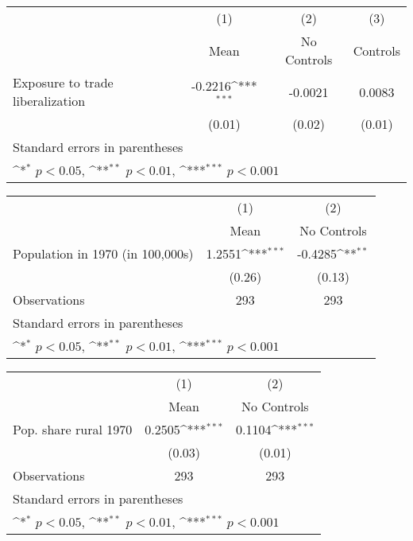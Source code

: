 {
\def\sym#1{\ifmmode^{#1}\else\(^{#1}\)\fi}
\begin{tabular}{l*{3}{c}}
\hline\hline
                    &\multicolumn{1}{c}{(1)}&\multicolumn{1}{c}{(2)}&\multicolumn{1}{c}{(3)}\\
                    &\multicolumn{1}{c}{Mean}&\multicolumn{1}{c}{No Controls}&\multicolumn{1}{c}{Controls}\\
\hline
Exposure to trade liberalization&     -0.2216\sym{***}&     -0.0021         &      0.0083         \\
                    &      (0.01)         &      (0.02)         &      (0.01)         \\
\hline\hline
\multicolumn{4}{l}{\footnotesize Standard errors in parentheses}\\
\multicolumn{4}{l}{\footnotesize \sym{*} \(p<0.05\), \sym{**} \(p<0.01\), \sym{***} \(p<0.001\)}\\
\end{tabular}
}
{
\def\sym#1{\ifmmode^{#1}\else\(^{#1}\)\fi}
\begin{tabular}{l*{2}{c}}
\hline\hline
                    &\multicolumn{1}{c}{(1)}&\multicolumn{1}{c}{(2)}\\
                    &\multicolumn{1}{c}{Mean}&\multicolumn{1}{c}{No Controls}\\
\hline
Population in 1970 (in 100,000s)&      1.2551\sym{***}&     -0.4285\sym{**} \\
                    &      (0.26)         &      (0.13)         \\
\hline
Observations        &         293         &         293         \\
\hline\hline
\multicolumn{3}{l}{\footnotesize Standard errors in parentheses}\\
\multicolumn{3}{l}{\footnotesize \sym{*} \(p<0.05\), \sym{**} \(p<0.01\), \sym{***} \(p<0.001\)}\\
\end{tabular}
}
{
\def\sym#1{\ifmmode^{#1}\else\(^{#1}\)\fi}
\begin{tabular}{l*{2}{c}}
\hline\hline
                    &\multicolumn{1}{c}{(1)}&\multicolumn{1}{c}{(2)}\\
                    &\multicolumn{1}{c}{Mean}&\multicolumn{1}{c}{No Controls}\\
\hline
Pop. share rural 1970&      0.2505\sym{***}&      0.1104\sym{***}\\
                    &      (0.03)         &      (0.01)         \\
\hline
Observations        &         293         &         293         \\
\hline\hline
\multicolumn{3}{l}{\footnotesize Standard errors in parentheses}\\
\multicolumn{3}{l}{\footnotesize \sym{*} \(p<0.05\), \sym{**} \(p<0.01\), \sym{***} \(p<0.001\)}\\
\end{tabular}
}
